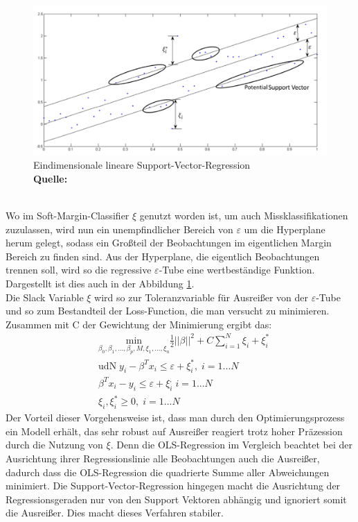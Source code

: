 \documentclass[a4paper,12pt]{thesis}
\newcommand*{\captionsource}[2]{%
	\caption[{#1}]{%
		#1%
		\\\hspace{\linewidth}%
		\textbf{Quelle:} #2%
	}%
}
\begin{document}
\begin{figure}[!ht]
	\centering
	\includegraphics[width=\textwidth]{Plots/SVM3.png}
	\captionsource{Eindimensionale lineare Support-Vector-Regression}{
		\cite{Awad2015}
	}
	\label{SVM3}
\end{figure}\\
Wo im Soft-Margin-Classifier $\xi$ genutzt worden ist, um auch Missklassifikationen zuzulassen, wird nun ein unempfindlicher Bereich von $\varepsilon$ um die Hyperplane herum gelegt, sodass ein Großteil der Beobachtungen im eigentlichen Margin Bereich zu finden sind. Aus der Hyperplane, die eigentlich Beobachtungen trennen soll, wird so die regressive $\varepsilon$-Tube eine wertbeständige Funktion. Dargestellt ist dies auch in der Abbildung \ref{SVM3}.\\
Die Slack Variable $\xi$ wird so zur Toleranzvariable für Ausreißer von der $\varepsilon$-Tube und so zum Bestandteil der Loss-Function, die man versucht zu minimieren. Zusammen mit C der Gewichtung der Minimierung ergibt das:
\begin{equation}
	\label{SVM:Regression}
	\begin{aligned}
		&\underset{\beta_0, \beta_1, ... , \beta_p,M,\xi_1,...,\xi_n}{\text{min}}\frac{1}{2}||\beta||^2 + C\sum_{i=1}^N \xi_i + \xi_i^*\\
		&\text{udN}\; y_i - \beta^T x_i \leq \varepsilon + \xi_i^*, \; i=1...N\\
		&\beta^T x_i - y_i \leq \varepsilon + \xi_i^, \; i=1...N\\
		&\xi_i, \xi_i^* \geq 0, \; i=1...N
	\end{aligned} 
\end{equation}
Der Vorteil dieser Vorgehensweise ist, dass man durch den Optimierungsprozess ein Modell erhält, das sehr robust auf Ausreißer reagiert trotz hoher Präzession durch die Nutzung von $\xi$. Denn die OLS-Regression im Vergleich beachtet bei der Ausrichtung ihrer Regressionslinie alle Beobachtungen auch die Ausreißer, dadurch dass die OLS-Regression die quadrierte Summe aller Abweichungen minimiert. Die Support-Vector-Regression hingegen macht die Ausrichtung der Regressionsgeraden nur von den Support Vektoren abhängig und ignoriert somit die Ausreißer. Dies macht dieses Verfahren stabiler.
\end{document}
